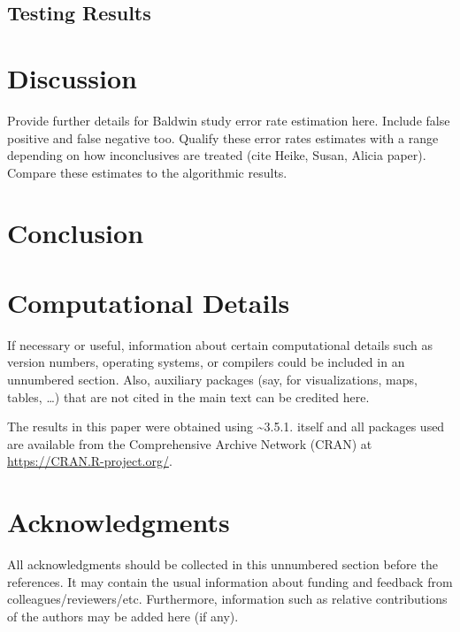 \documentclass[
]{jdssv}
\begin{document}
\hypertarget{testing-results}{%
\subsection{Testing Results}\label{testing-results}}

\hypertarget{discussion}{%
\section{Discussion}\label{discussion}}

Provide further details for Baldwin study error rate estimation here.
Include false positive and false negative too. Qualify these error rates
estimates with a range depending on how inconclusives are treated (cite
Heike, Susan, Alicia paper). Compare these estimates to the algorithmic
results.

\hypertarget{conclusion}{%
\section{Conclusion}\label{conclusion}}

\newpage

\hypertarget{computational-details}{%
\section*{Computational Details}\label{computational-details}}

If necessary or useful, information about certain computational details
such as version numbers, operating systems, or compilers could be
included in an unnumbered section. Also, auxiliary packages (say, for
visualizations, maps, tables, \dots) that are not cited in the main text
can be credited here.

The results in this paper were obtained using
\textasciitilde3.5.1.  itself and all packages
used are available from the Comprehensive  Archive Network
(CRAN) at \url{https://CRAN.R-project.org/}.

\hypertarget{acknowledgments}{%
\section*{Acknowledgments}\label{acknowledgments}}

All acknowledgments should be collected in this unnumbered section
before the references. It may contain the usual information about
funding and feedback from colleagues/reviewers/etc. Furthermore,
information such as relative contributions of the authors may be added
here (if any).



\newpage

\setcounter{section}{0}
\renewcommand{\thesection}{\Alph{section}}
\end{document}
